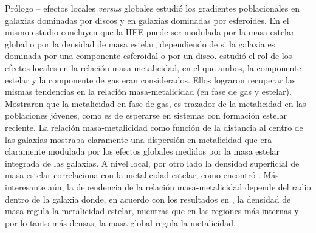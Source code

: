 \documentclass[xcolor=dvipsnames,4pt,hyperref={colorlinks,citecolor=black,linkcolor=black,urlcolor=black}]{beamer}
\begin{document}
\begin{frame}[allowframebreaks]{Prólogo -- efectos locales \emph{versus} globales}
%
\citet{Gonzalez2014a} estudió los gradientes poblacionales en galaxias dominadas por discos y en
galaxias dominadas por esferoides. En el mismo estudio concluyen que la HFE puede ser modulada por
la masa estelar global o por la densidad de masa estelar, dependiendo de si la galaxia es dominada
por una componente esferoidal o por un disco. \citet{Gonzalez2014b} estudió el rol de los efectos
locales en la relación masa-metalicidad, en el que ambos, la componente estelar y la componente de
gas eran considerados. Ellos lograron recuperar las mismas tendencias en la relación
masa-metalicidad (en fase de gas y estelar). Mostraron que la metalicidad en fase de gas, es
trazador de la metalicidad en las poblaciones jóvenes, como es de esperarse en sistemas con
formación estelar reciente. La relación masa-metalicidad como función de la distancia al centro de
las galaxias mostraba claramente una dispersión en metalicidad que era claramente modulada por los
efectos globales medidos por la masa estelar integrada de las galaxias. A nivel local, por otro lado
la densidad superficial de masa estelar correlaciona con la metalicidad estelar, como encontró
\citet{Sanchez2013}. Más interesante aún, la dependencia de la relación masa-metalicidad depende del
radio dentro de la galaxia donde, en acuerdo con los resultados en \citet{Gonzalez2014a}, la
densidad de masa regula la metalicidad estelar, mientras que en las regiones más internas y por lo
tanto más densas, la masa global regula la metalicidad.
%
\end{frame}
\end{document}
